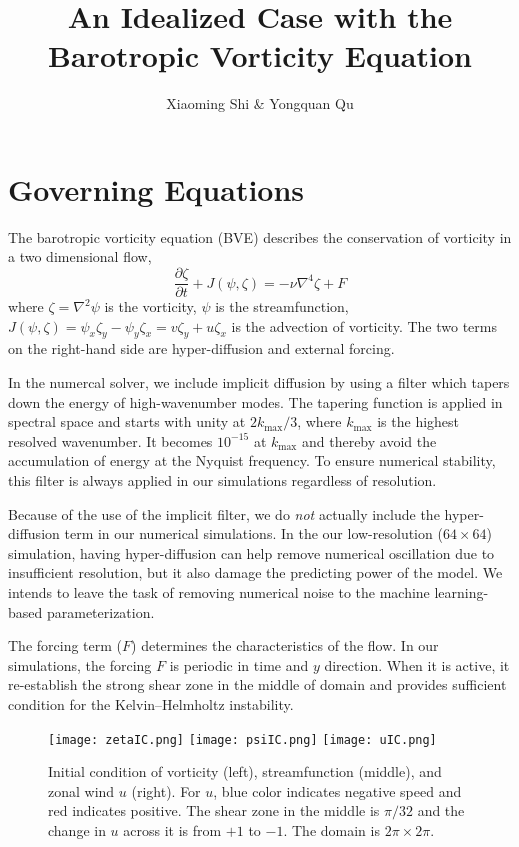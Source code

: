 \documentclass[a4paper,11pt]{article}
\title{An Idealized Case with the Barotropic Vorticity Equation}
\author{Xiaoming Shi \& Yongquan Qu}
\begin{document}
\maketitle

\section*{Governing Equations}

The barotropic vorticity equation (BVE) describes the conservation of vorticity in a two dimensional flow,
\begin{equation}
 \frac{\partial \zeta}{\partial t} + J(\psi, \zeta) = -\nu\nabla^4{\zeta} + F
\end{equation}
where $\zeta= \nabla^2\psi$ is the vorticity, $\psi$ is the streamfunction, $J(\psi, \zeta) = \psi_x\zeta_y - \psi_y\zeta_x = v\zeta_y + u\zeta_x$ is the advection of vorticity. The two terms on the right-hand side are hyper-diffusion and external forcing. 

In the numercal solver, we include implicit diffusion by using a filter which tapers down the energy of high-wavenumber modes. The tapering function is applied in spectral space and starts with unity at $2k_{\text{max}}/3$, where $k_{\text{max}}$ is the highest resolved wavenumber. It becomes $10^{-15}$ at $k_{\text{max}}$ and thereby avoid the accumulation of energy at the Nyquist frequency. To ensure numerical stability, this filter is always applied in our simulations regardless of resolution.  

Because of the use of the implicit filter, we do \textit{not} actually include the hyper-diffusion term in our numerical simulations. In the our low-resolution ($64\times64$) simulation, having hyper-diffusion can help remove numerical oscillation due to insufficient resolution, but it also damage the predicting power of the model. We intends to leave the task of removing numerical noise to the machine learning-based parameterization. 

The forcing term ($F$) determines the characteristics of the flow. In our simulations, the forcing $F$ is periodic in time and $y$ direction. When it is active, it re-establish the strong shear zone in the middle of domain and provides sufficient condition for the Kelvin–Helmholtz instability. 
\begin{figure}
 \begin{center}
 \texttt{[image: zetaIC.png]}
 \texttt{[image: psiIC.png]}
 \texttt{[image: uIC.png]}
 \caption{Initial condition of vorticity (left), streamfunction (middle), and zonal wind $u$ (right). For $u$, blue color indicates negative speed and red indicates positive. The shear zone in the middle is $\pi/32$ and the change in $u$ across it is from $+1$ to $-1$. The domain is $2\pi\times 2\pi$.}
\end{center}
\end{figure}
\end{document}
